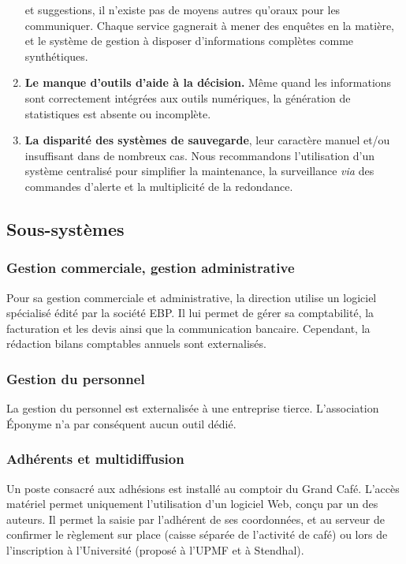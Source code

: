 \begin{enumerate}
      et suggestions, il n'existe pas de moyens autres qu'oraux pour les communiquer.
      Chaque service gagnerait à mener des enquêtes en la matière, et le système de gestion
      à disposer d'informations complètes comme synthétiques.
\item \textbf{Le manque d'outils d'aide à la décision.} Même quand les informations sont correctement
      intégrées aux outils numériques, la génération de statistiques est absente ou
      incomplète.
\item \textbf{La disparité des systèmes de sauvegarde}, leur caractère manuel et/ou insuffisant
      dans de nombreux cas.
      Nous recommandons l'utilisation d'un système centralisé pour simplifier la maintenance,
      la surveillance \textit{via} des commandes d'alerte et la multiplicité de la redondance.
\end{enumerate}

\subsection{Sous-systèmes}

\subsubsection{Gestion commerciale, gestion administrative}

Pour sa gestion commerciale et administrative, la direction utilise un logiciel spécialisé
 édité par la société EBP.
Il lui permet de gérer sa comptabilité, la facturation et les devis ainsi que la
communication bancaire. Cependant, la rédaction bilans comptables annuels sont externalisés.

\subsubsection{Gestion du personnel}

La gestion du personnel est externalisée à une entreprise tierce.
L'association Éponyme n'a par conséquent aucun outil dédié.

\subsubsection{Adhérents et multidiffusion}
\label{multidiffusion}

Un poste consacré aux adhésions est installé au comptoir du Grand Café.
L'accès matériel permet uniquement l'utilisation d'un logiciel Web, conçu par un des auteurs.
Il permet la saisie par l'adhérent de ses coordonnées, et au serveur de confirmer
le règlement sur place (caisse séparée de l'activité de café) ou lors de l'inscription
à l'Université (proposé à l'UPMF et à Stendhal).

